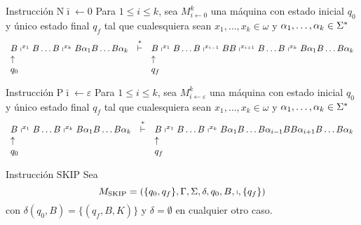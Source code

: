\begin{frame}
  \begin{block}{Instrucción $\mathrm{N}\bar{\imath} \leftarrow 0$}
    \PN Para $1 \leq i \leq k$, sea $M_{i \leftarrow 0}^{k}$ una máquina con estado inicial $q_{0}$ y único estado final
    $q_{f}$ tal que cualesquiera sean $x_{1}, \dotsc, x_{k} \in \omega$ y $\alpha_{1}, \dotsc, \alpha_{k} \in \Sigma^{\ast}$
    \sizeOfLetterFirst
    \[
      \begin{array}{lcl}
        B \shortmid^{x_{1}} B \dotsc B \shortmid^{x_{k}} B \alpha_{1} B \dotsc B \alpha_{k} &\overset{\ast}{\vdash}& B
          \shortmid^{x_{1}} B \dotsc B \shortmid^{x_{i-1}} B B \shortmid^{x_{i+1}} B \dotsc B \shortmid^{x_{k}} B
          \alpha_{1} B \dotsc B \alpha_{k} \\
        \uparrow && \uparrow \\
        q_{0} & & q_{f}
      \end{array}
    \]
  \end{block}

  \begin{block}{Instrucción $\mathrm{P}\bar{\imath} \leftarrow \varepsilon$}
    \PN Para $1 \leq i \leq k$, sea $M_{i \leftarrow \varepsilon}^{k}$ una máquina con estado inicial $q_{0}$ y único
    estado final $q_{f}$ tal que cualesquiera sean $x_{1}, \dotsc, x_{k} \in \omega$ y $\alpha_{1}, \dotsc, \alpha_{k}
    \in \Sigma^{\ast}$
    \sizeOfLetterFirst
    \[
      \begin{array}{lcl}
        B \shortmid^{x_{1}} B \dotsc B \shortmid^{x_{k}} B \alpha_{1} B \dotsc B \alpha_{k} &\overset{\ast}{\vdash}& B
          \shortmid^{x_{1}} B \dotsc B \shortmid^{x_{k}} B \alpha_{1} B \dotsc B \alpha_{i-1} B B \alpha_{i+1} B \dotsc
          B \alpha_{k} \\
        \uparrow && \uparrow \\
        q_{0} & & q_{f}
      \end{array}
    \]
  \end{block}

  \begin{block}{Instrucción $\mathrm{SKIP}$}
    \PN Sea
    \begin{equation*}
      M_{\mathrm{SKIP}} = \left(\{q_{0}, q_{f}\}, \Gamma, \Sigma, \delta, q_{0}, B, \shortmid, \{q_{f}\}\right)
    \end{equation*}
    \PN con $\delta(q_{0}, B) = \{(q_{f}, B, K)\}$ y $\delta = \emptyset$ en cualquier otro caso.
  \end{block}
\end{frame}

